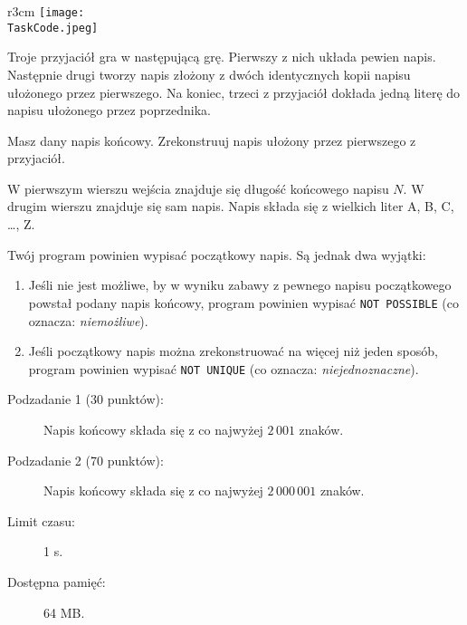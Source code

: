 \documentclass{boi2014-pl}
\renewcommand{\TaskCode}{friends}
\begin{document}
    \begin{wrapfigure}{r}{3cm}
		\texttt{[image: \\TaskCode.jpeg]}
	\end{wrapfigure}
    Troje przyjaciół gra w następującą grę.
    Pierwszy z nich układa pewien napis.
    Następnie drugi tworzy napis złożony z dwóch identycznych kopii napisu ułożonego przez pierwszego.
    Na koniec, trzeci z przyjaciół dokłada jedną literę do napisu ułożonego przez poprzednika.

    \Task
    Masz dany napis końcowy. Zrekonstruuj napis ułożony przez pierwszego z przyjaciół.

    \Input
    W pierwszym wierszu wejścia znajduje się długość końcowego napisu $N$.
    W drugim wierszu znajduje się sam napis.
    Napis składa się z wielkich liter A, B, C, \ldots{}, Z.

    \Output
    Twój program powinien wypisać początkowy napis.
    Są jednak dwa wyjątki:
    \begin{enumerate}
        \item Jeśli nie jest możliwe, by w wyniku zabawy z pewnego napisu początkowego powstał podany napis końcowy, program powinien wypisać {\tt NOT POSSIBLE}
          (co oznacza: \emph{niemożliwe}).
        \item Jeśli początkowy napis można zrekonstruować na więcej niż jeden sposób, program powinien wypisać {\tt NOT
          UNIQUE} (co oznacza: \emph{niejednoznaczne}).
    \end{enumerate}
    

    \Examples


    \Scoring

    \begin{description}
        \item[Podzadanie 1 (30 punktów):] Napis końcowy składa się z co najwyżej $2\,001$ znaków.
        \item[Podzadanie 2 (70 punktów):] Napis końcowy składa się z co najwyżej $2\,000\,001$ znaków.
    \end{description}

    \Constraints

    \begin{description}
        \item[Limit czasu:] 1 s.
        \item[Dostępna pamięć:] 64 MB.
    \end{description}
\end{document}
